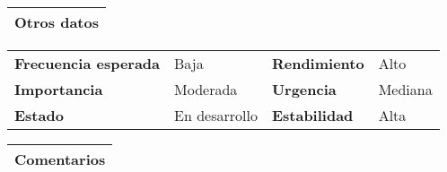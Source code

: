 \documentclass[11pt,a4paper]{article}
\begin{document}
\begin{table}[H]
	\begin{tabularx}{\textwidth}{X}
		\textbf{Otros datos}\\ \hline
	\end{tabularx}

	\begin{tabularx}{\textwidth}{lXlX}
		\textbf{Frecuencia esperada} & Baja & \textbf{Rendimiento} & Alto\\
		\textbf{Importancia} & Moderada & \textbf{Urgencia} & Mediana \\
		\textbf{Estado} & En desarrollo & \textbf{Estabilidad} & Alta\\
	\end{tabularx}
	
	\begin{tabularx}{\textwidth}{X}
		\textbf{Comentarios}\\ \hline
	\end{tabularx}
\end{table}

\newpage


\end{document}

